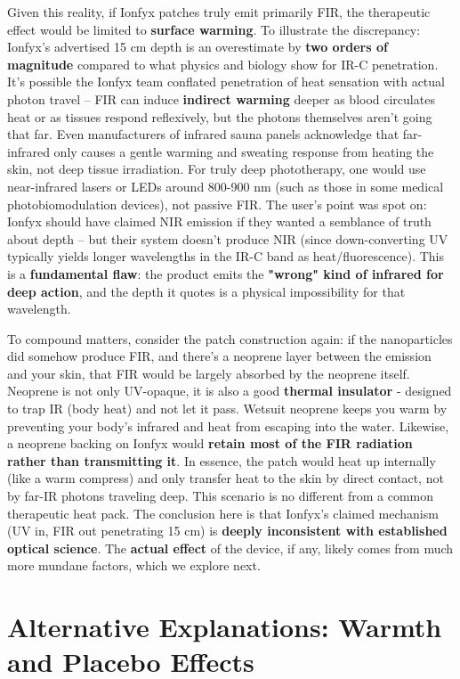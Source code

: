 \documentclass{article}
\begin{document}
Given this reality, if Ionfyx patches truly emit primarily FIR, the therapeutic effect would be limited to \textbf{surface warming}. To illustrate the discrepancy: Ionfyx's advertised 15 cm depth is an overestimate by \textbf{two orders of magnitude} compared to what physics and biology show for IR-C penetration. It's possible the Ionfyx team conflated penetration of heat sensation with actual photon travel – FIR can induce \textbf{indirect warming} deeper as blood circulates heat or as tissues respond reflexively, but the photons themselves aren't going that far. Even manufacturers of infrared sauna panels acknowledge that far-infrared only causes a gentle warming and sweating response from heating the skin, not deep tissue irradiation. For truly deep phototherapy, one would use near-infrared lasers or LEDs around 800-900 nm (such as those in some medical photobiomodulation devices), not passive FIR. The user's point was spot on: Ionfyx should have claimed NIR emission if they wanted a semblance of truth about depth – but their system doesn't produce NIR (since down-converting UV typically yields longer wavelengths in the IR-C band as heat/fluorescence). This is a \textbf{fundamental flaw}: the product emits the \textbf{"wrong" kind of infrared for deep action}, and the depth it quotes is a physical impossibility for that wavelength.

To compound matters, consider the patch construction again: if the nanoparticles did somehow produce FIR, and there's a neoprene layer between the emission and your skin, that FIR would be largely absorbed by the neoprene itself. Neoprene is not only UV-opaque, it is also a good \textbf{thermal insulator} - designed to trap IR (body heat) and not let it pass. Wetsuit neoprene keeps you warm by preventing your body's infrared and heat from escaping into the water. Likewise, a neoprene backing on Ionfyx would \textbf{retain most of the FIR radiation rather than transmitting it}. In essence, the patch would heat up internally (like a warm compress) and only transfer heat to the skin by direct contact, not by far-IR photons traveling deep. This scenario is no different from a common therapeutic heat pack. The conclusion here is that Ionfyx's claimed mechanism (UV in, FIR out penetrating 15 cm) is \textbf{deeply inconsistent with established optical science}. The \textbf{actual effect} of the device, if any, likely comes from much more mundane factors, which we explore next.

\section{Alternative Explanations: Warmth and Placebo Effects}
\end{document}
